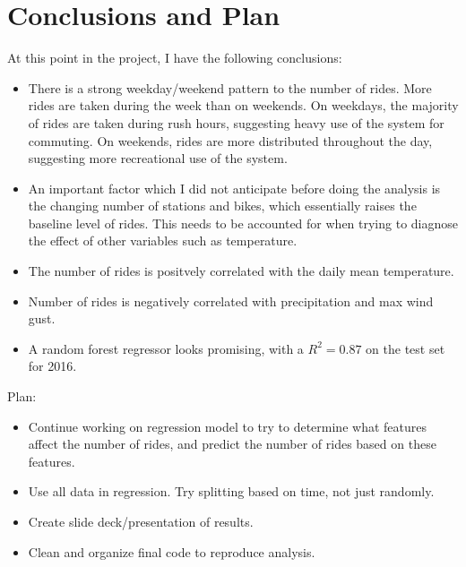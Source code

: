 \documentclass[11pt]{article}
\begin{document}
\clearpage
\section{Conclusions and Plan}

At this point in the project, I have the following conclusions:

\begin{itemize}

\item There is a strong weekday/weekend pattern to the number of rides. More rides are taken during the week than on weekends. On weekdays, the majority of rides are taken during rush hours, suggesting heavy use of the system for commuting. On weekends, rides are more distributed throughout the day, suggesting more recreational use of the system. 

\item An important factor which I did not anticipate before doing the analysis is the changing number of stations and bikes, which essentially raises the baseline level of rides. This needs to be accounted for when trying to diagnose the effect of other variables such as temperature.

\item The number of rides is positvely correlated with the daily mean temperature.%

\item Number of rides is negatively correlated with precipitation and max wind gust.%

\item A random forest regressor looks promising, with a $R^2=0.87$ on the test set for 2016.

\end{itemize}

Plan:

\begin{itemize}

\item Continue working on regression model to try to determine what features affect the number of rides, and predict the number of rides based on these features. 

\item Use all data in regression. Try splitting based on time, not just randomly.

\item Create slide deck/presentation of results.

\item Clean and organize final code to reproduce analysis.

\end{itemize}
\end{document}
